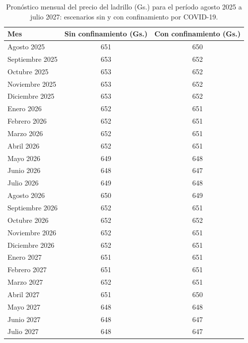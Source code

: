 \begin{table}[H]
    \centering
    \caption{Pronóstico mensual del precio del ladrillo (Gs.) para el período agosto 2025 a julio 2027: escenarios sin y con confinamiento por COVID-19.}
    \label{tab:sarimax_ladrillo_pronostico}
    \begin{tabular}{lcc}
        \toprule
        \textbf{Mes} & \textbf{Sin confinamiento (Gs.)} & \textbf{Con confinamiento (Gs.)} \\
        \midrule
        Agosto 2025      & 651 & 650 \\
        Septiembre 2025  & 653 & 652 \\
        Octubre 2025     & 653 & 652 \\
        Noviembre 2025   & 653 & 652 \\
        Diciembre 2025   & 653 & 652 \\
        Enero 2026       & 652 & 651 \\
        Febrero 2026     & 652 & 651 \\
        Marzo 2026       & 652 & 651 \\
        Abril 2026       & 652 & 651 \\
        Mayo 2026        & 649 & 648 \\
        Junio 2026       & 648 & 647 \\
        Julio 2026       & 649 & 648 \\
        Agosto 2026      & 650 & 649 \\
        Septiembre 2026  & 652 & 651 \\
        Octubre 2026     & 652 & 652 \\
        Noviembre 2026   & 652 & 651 \\
        Diciembre 2026   & 652 & 651 \\
        Enero 2027       & 651 & 651 \\
        Febrero 2027     & 651 & 651 \\
        Marzo 2027       & 652 & 651 \\
        Abril 2027       & 651 & 650 \\
        Mayo 2027        & 648 & 648 \\
        Junio 2027       & 648 & 647 \\
        Julio 2027       & 648 & 647 \\
        \bottomrule
    \end{tabular}
\end{table}
